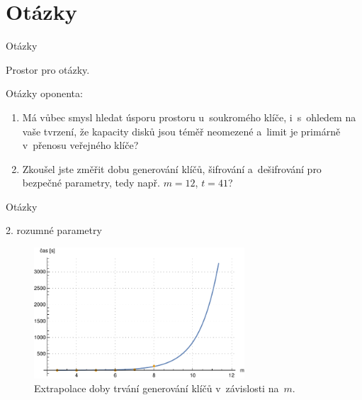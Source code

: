 \documentclass{beamer}
\begin{document}
\section*{Otázky}
\begin{frame}{Otázky}

    \begin{center}
        \large Prostor pro otázky.
    \end{center}

        \pause
    Otázky oponenta:

    \begin{enumerate}

            \pause
        \item Má vůbec smysl hledat úsporu prostoru u~soukromého klíče,
            i~s~ohledem na vaše tvrzení, že kapacity disků jsou téměř neomezené
            a~limit je primárně v~přenosu veřejného klíče?

            \pause
        \item Zkoušel jste změřit dobu generování klíčů, šifrování a~dešifrování
            pro bezpečné parametry, tedy např. $m=12$, $t=41$?

    \end{enumerate}


\end{frame}

\begin{frame}{Otázky}

    \begin{block}{2. rozumné parametry}

        \begin{figure}
            \centering
            \includegraphics[width=0.7\textwidth]{../../implementace/grafy/extrapolace_generovani.pdf}
            \caption{Extrapolace doby trvání generování klíčů v~závislosti
            na~$m$.}
        \end{figure}
    \end{block}
\end{frame}
\end{document}
